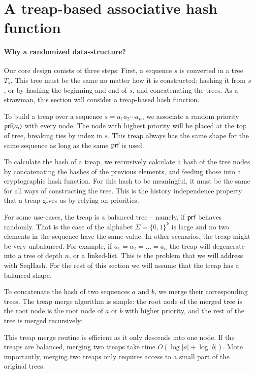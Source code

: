 \section{A treap-based associative hash function}
\label{s:treap}

\paragraph{Why a randomized data-structure?}

Our core design conists of three steps: First, a sequence $s$ is converted in a
tree $T_s$. This tree must be the same no matter how it is constructed; hashing
it from $s$, or by hashing the beginning and end of $s$, and concatenating the
trees. As a strawman, this section will consider a treap-based hash function.

To build a treap over a sequence $s = a_1 a_2 \cdots a_n$, we associate a
random priority $\text{prf}(a_i)$ with every node. The node with highest priority
will be placed at the top of tree, breaking ties by index in $s$. This treap
always has the same shape for the same sequence as long as the same $\text{prf}$ is
used. 

To calculate the hash of a treap, we recursively calculate a hash of the tree
nodes by concatenating the hashes of the previous elements, and feeding those
into a cryptographic hash function. For this hash to be meaningful, it must be
the same for all ways of constructing the tree. This is the history independence
property that a treap gives us by relying on priorities.

For some use-cases, the treap is a balanced tree -- namely, if $\text{prf}$ behaves
randomly.  That is the case of the alphabet $\Sigma = \{0,1\}^k$ is large and
no two elements in the sequence have the same value. In other scenarios, the
treap might be very unbalanced.  For example, if $a_1 = a_2 = \ldots = a_n$ the
treap will degenerate into a tree of depth $n$, or a linked-list. This is the
problem that we will address with SeqHash. For the rest of this section we will
assume that the treap has a balanced shape.

To concatenate the hash of two sequences $a$ and $b$, we merge their
corresponding trees. The treap merge algorithm is simple: the root node
of the merged tree is the root node is the root node of $a$ or $b$ with higher
priority, and the rest of the tree is merged recursively:



This treap merge routine is efficient as it only descends into one node. If
the treaps are balanced, merging two treaps take time $O(\log |a| + \log |b|)$.
More importantly, merging two treaps only requires access to a small part of
the original trees. 

